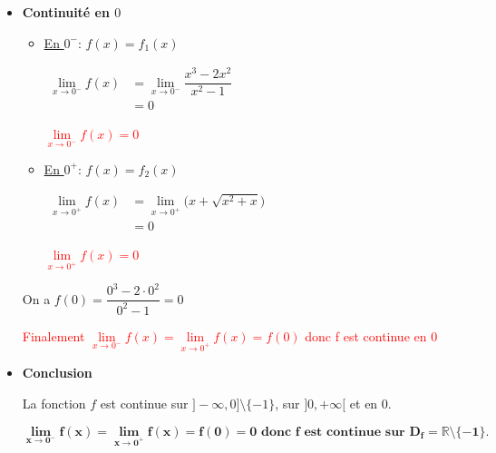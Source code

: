 \documentclass[12pt,a4paper]{article}
\begin{document}
\begin{enumerate}
\begin{enumerate}
\begin{itemize}
\begin{itemize}
En particulier, elle est continue sur $]-\infty,0]\setminus\{-1\}$.

\medskip

\item \textbf{ Sur $]0,+\infty[$}

Pour tout $x>0$, on a $x^2+x>0$, donc la fonction
\(
x\longmapsto \sqrt{x^2+x}
\)
est bien définie et continue sur $]0,+\infty[$.

Ainsi, la fonction
\(
x\longmapsto x+\sqrt{x^2+x}
\)
étant somme de fonctions continues, est continue sur $]0,+\infty[$.
\end{itemize}

\item \textbf{ Continuité en $0$}

 \begin{itemize}
\item \underline{En $0^-$}: $f(x)=f_{1}(x)$   
    
\(
\begin{aligned}
 \lim\limits_{x \to 0^-} f(x) &= \lim\limits_{x \to 0^-} \dfrac{x^3-2x^2}{x^2-1}\\
 															&= 0
\end{aligned}    
\)

\textcolor{red}{{\underline{$\lim\limits_{x \to 0^-} f(x) = 0$}}}

\item \underline{En $0^+$}: $f(x)=f_{2}(x)$   
    
\(
\begin{aligned}
 \lim\limits_{x \to 0^+} f(x) &= \lim\limits_{x \to 0^+} \bigl(x+\sqrt{x^2+x}\bigr)\\
															&=0
\end{aligned}    
\)

\textcolor{red}{{\underline{$\lim\limits_{x \to 0^+} f(x) = 0$}}}
\end{itemize}   

On a $f(0)=\dfrac{0^3-2\cdot 0^2}{0^2-1}=0$

\textcolor{red}{Finalement $\lim\limits_{x \to 0^-} f(x) = \lim\limits_{x \to 0^+} f(x) = f(0)$ donc f est continue en $0$}

\item \textbf{ Conclusion}

La fonction $f$ est continue sur $]-\infty,0]\setminus\{-1\}$, sur $]0,+\infty[$ et en $0$.

    \begin{resultbox}
    \[
    \mathbf{ \lim\limits_{x \to 0^-} f(x) = \lim\limits_{x \to 0^+} f(x) = f(0)=0 \text{ donc } f \text{ est continue sur } D_f=\mathbb{R}\setminus\{-1\}. }
    \]
   \end{resultbox} 


\end{itemize}
\end{enumerate}
\end{enumerate}
\end{document}
